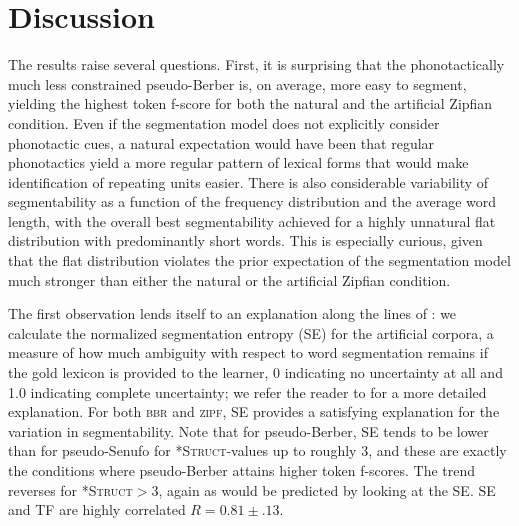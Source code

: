 \documentclass[11pt]{article}
\begin{document}
\section{Discussion}
\vspace*{-5pt}
The results raise several questions. First, it is surprising that the phonotactically much less constrained pseudo-Berber is, on average, more easy to segment, yielding the highest token f-score for both the natural and the artificial Zipfian condition. Even if the segmentation model does not explicitly consider phonotactic cues, a natural expectation would have been that regular phonotactics yield a more regular pattern of lexical forms that would make identification of repeating units easier. There is also considerable variability of segmentability as a function of the frequency distribution and the average word length, with the overall best segmentability achieved for a highly unnatural flat distribution with predominantly short words. This is especially curious, given that the flat distribution violates the prior expectation of the segmentation model much stronger than either the natural or the artificial Zipfian condition.

The first observation lends itself to an explanation along the lines of \cite{Fourtassi13a}: we calculate the normalized segmentation entropy (SE) for the artificial corpora, a measure of how much ambiguity with respect to word segmentation remains if the gold lexicon is provided to the learner, 0 indicating no uncertainty at all and 1.0 indicating complete uncertainty; we refer the reader to \cite{Fourtassi13a} for a more detailed explanation. For both \textsc{bbr} and \textsc{zipf}, SE provides a satisfying explanation for the variation in segmentability. Note that for pseudo-Berber, SE tends to be lower than for pseudo-Senufo for \textsc{*Struct}-values up to roughly 3, and these are exactly the conditions where pseudo-Berber attains higher token f-scores. The trend reverses for \textsc{*Struct}$>$3, again as would be predicted by looking at the SE. SE and TF are highly correlated $R = 0.81 \pm .13$.
\end{document}
